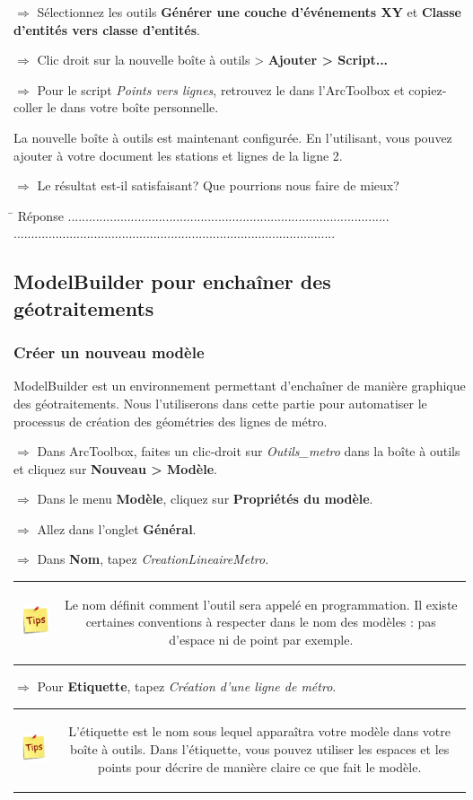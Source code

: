 \documentclass[11pt]{article}
\newcommand{\action}{$\Rightarrow$ }
\newcommand{\reponse}{
	\begin{tabbing}
	\hspace{2cm}\=\kill
	Réponse \> ............................................................................................ \\
 	\> ............................................................................................
	\end{tabbing}
}
\newenvironment{note}{%
	\begin{tabular}[t t]{c c}
		\includegraphics{img/tips.png}
		 &
		\begin{minipage}[c]{0.9\linewidth}
			\begin{sffamily}
}{%
			\end{sffamily}
		\end{minipage}
	\end{tabular}
}
\begin{document}
\action Sélectionnez les outils \textbf{Générer une couche d'événements XY} et \textbf{Classe d'entités vers classe d'entités}.

\action Clic droit sur la nouvelle boîte à outils > \textbf{Ajouter > Script...}

\action Pour le script \textit{Points vers lignes}, retrouvez le dans l'ArcToolbox et copiez-coller le dans votre boîte personnelle.

La nouvelle boîte à outils est maintenant configurée. En l'utilisant, vous pouvez ajouter à votre document les stations et lignes de la ligne 2.

\action Le résultat est-il satisfaisant? Que pourrions nous faire de mieux?

\reponse


\subsection{ModelBuilder pour enchaîner des géotraitements}
\label{modelbuilder}
\subsubsection{Créer un nouveau modèle}
ModelBuilder est un environnement permettant d'enchaîner de manière graphique des géotraitements. Nous l'utiliserons dans cette partie pour automatiser le processus de création des géométries des lignes de métro.

\action Dans ArcToolbox, faites un clic-droit sur \textit{Outils\_metro} dans la boîte à outils et cliquez sur \textbf{Nouveau > Modèle}.

\action Dans le menu \textbf{Modèle}, cliquez sur \textbf{Propriétés du modèle}.

\action Allez dans l’onglet \textbf{Général}.

\action Dans \textbf{Nom}, tapez \textit{CreationLineaireMetro}.

\begin{note}
Le nom définit comment l'outil sera appelé en programmation. Il existe certaines conventions à respecter dans le nom des modèles : pas d'espace ni de point par exemple.
\end{note}

\action Pour \textbf{Etiquette}, tapez \textit{Création d'une ligne de métro}.

\begin{note}
L'étiquette est le nom sous lequel apparaîtra votre modèle dans votre boîte à outils. Dans l'étiquette, vous pouvez utiliser les espaces et les points pour décrire de manière claire ce que fait le modèle.
\end{note}
\end{document}
